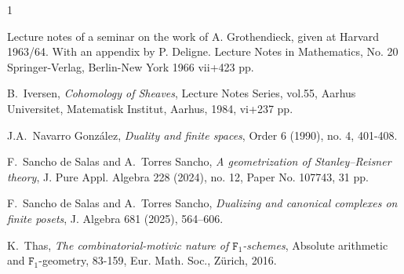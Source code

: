 \documentclass[amssymb,amscd,11pt,20pt]{amsart}
\newcommand{\FF}{{\mathtt F}}
\newcommand{\0}{\mathbf 0}
\theoremstyle{plain}
\numberwithin{equation}{thm}
\begin{document}
\begin{thebibliography}{1}






Lecture notes of a seminar on the work of A. Grothendieck, given at Harvard 1963/64. With an appendix by P. Deligne. Lecture Notes in Mathematics, No. 20 Springer-Verlag, Berlin-New York 1966 vii+423 pp.



 {\sc B.~Iversen}, {\em Cohomology of Sheaves}, 
Lecture Notes Series, vol.55, Aarhus Universitet, Matematisk Institut, Aarhus, 1984, vi+237 pp.




 {\sc J.A.~Navarro Gonz\'alez}, {\em Duality and finite spaces}, Order 6 (1990), no. 4, 401-408.






 {\sc  F.~Sancho de Salas and A.~Torres Sancho}, {\em A geometrization of Stanley--Reisner theory},
J. Pure Appl. Algebra 228 (2024), no. 12, Paper No. 107743, 31 pp. 


 {\sc  F.~Sancho de Salas and A.~Torres Sancho}, {\em Dualizing and canonical complexes on finite posets}, J. Algebra 681 (2025), 564–606.

 



 {\sc K.~Thas}, {\em The combinatorial-motivic nature of $\FF_1$-schemes}, Absolute arithmetic and $\FF_1$-geometry, 83-159, Eur. Math. Soc., Z\"urich, 2016.
 

\end{thebibliography} 
\end{document}
